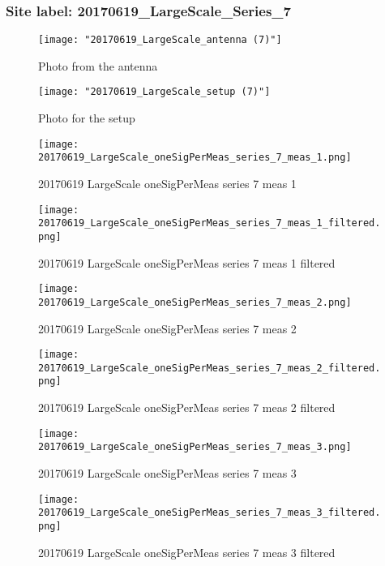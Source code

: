 \subsubsection{Site label: 20170619\_LargeScale\_Series\_7}
\begin{figure}[ht] \caption{Photo from the antenna}
\texttt{[image: "20170619\_LargeScale\_antenna (7)"]}\centering\end{figure}
\begin{figure}[ht] \caption{Photo for the setup}
\texttt{[image: "20170619\_LargeScale\_setup (7)"]}\centering\end{figure}
\begin{figure}[ht] \caption{20170619 LargeScale oneSigPerMeas series 7 meas 1}
\texttt{[image: 20170619\_LargeScale\_oneSigPerMeas\_series\_7\_meas\_1.png]}\centering\end{figure}
\begin{figure}[ht] \caption{20170619 LargeScale oneSigPerMeas series 7 meas 1 filtered}
\texttt{[image: 20170619\_LargeScale\_oneSigPerMeas\_series\_7\_meas\_1\_filtered.png]}\centering\end{figure}
\begin{figure}[ht] \caption{20170619 LargeScale oneSigPerMeas series 7 meas 2}
\texttt{[image: 20170619\_LargeScale\_oneSigPerMeas\_series\_7\_meas\_2.png]}\centering\end{figure}
\begin{figure}[ht] \caption{20170619 LargeScale oneSigPerMeas series 7 meas 2 filtered}
\texttt{[image: 20170619\_LargeScale\_oneSigPerMeas\_series\_7\_meas\_2\_filtered.png]}\centering\end{figure}
\begin{figure}[ht] \caption{20170619 LargeScale oneSigPerMeas series 7 meas 3}
\texttt{[image: 20170619\_LargeScale\_oneSigPerMeas\_series\_7\_meas\_3.png]}\centering\end{figure}
\begin{figure}[ht] \caption{20170619 LargeScale oneSigPerMeas series 7 meas 3 filtered}
\texttt{[image: 20170619\_LargeScale\_oneSigPerMeas\_series\_7\_meas\_3\_filtered.png]}\centering\end{figure}
\clearpage
